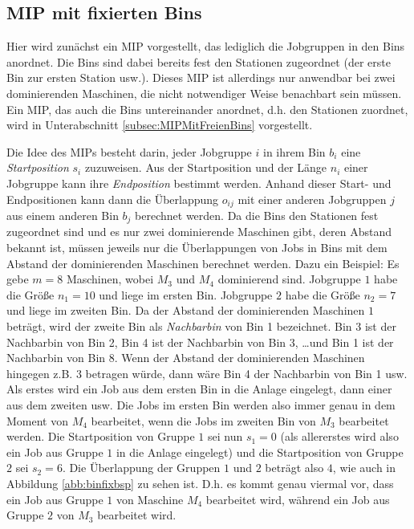 \documentclass{scrreprt}
\begin{document}
\subsection{MIP mit fixierten Bins}
\label{subsec:MIPMitFixiertenBins}
Hier wird zunächst ein MIP vorgestellt, das lediglich die Jobgruppen in den Bins anordnet.
Die Bins sind dabei bereits fest den Stationen zugeordnet (der erste Bin zur ersten Station usw.).
Dieses MIP ist allerdings nur anwendbar bei zwei dominierenden Maschinen, die nicht notwendiger Weise benachbart sein müssen.
Ein MIP, das auch die Bins untereinander anordnet, d.h. den Stationen zuordnet, wird in Unterabschnitt \ref{subsec:MIPMitFreienBins} vorgestellt.

Die Idee des MIPs besteht darin, jeder Jobgruppe $i$ in ihrem Bin $b_i$ eine \textit{Startposition} $s_i$ zuzuweisen.
Aus der Startposition und der Länge $n_i$ einer Jobgruppe kann ihre \textit{Endposition} bestimmt werden.
Anhand dieser Start- und Endpositionen kann dann die Überlappung $o_{ij}$ mit einer anderen Jobgruppen $j$ aus einem anderen Bin $b_j$
berechnet werden.
Da die Bins den Stationen fest zugeordnet sind und es nur zwei dominierende Maschinen gibt, deren Abstand bekannt ist, 
müssen jeweils nur die Überlappungen von Jobs in Bins mit dem Abstand der dominierenden Maschinen berechnet werden.
Dazu ein Beispiel: Es gebe $m=8$ Maschinen, wobei $M_3$ und $M_4$ dominierend sind. 
Jobgruppe $1$ habe die Größe $n_1=10$ und liege im ersten Bin.
Jobgruppe $2$ habe die Größe $n_2=7$ und liege im zweiten Bin.
Da der Abstand der dominierenden Maschinen $1$ beträgt, wird der zweite Bin als \textit{Nachbarbin} von Bin 1 bezeichnet.
Bin 3 ist der Nachbarbin von Bin 2, Bin 4 ist der Nachbarbin von Bin 3, \ldots und Bin 1 ist der Nachbarbin von Bin 8.
Wenn der Abstand der dominierenden Maschinen hingegen z.B. $3$ betragen würde, dann wäre Bin 4 der Nachbarbin von Bin 1 usw.
Als erstes wird ein Job aus dem ersten Bin in die Anlage eingelegt, dann einer aus dem zweiten usw. 
Die Jobs im ersten Bin werden also immer genau in dem Moment von $M_4$ bearbeitet, wenn die Jobs im zweiten Bin von $M_3$ bearbeitet werden.
Die Startposition von Gruppe $1$ sei nun $s_1=0$ (als allererstes wird also ein Job aus Gruppe $1$ in die Anlage eingelegt)
und die Startposition von Gruppe $2$ sei $s_2=6$.
Die Überlappung der Gruppen $1$ und $2$ beträgt also $4$, wie auch in Abbildung \ref{abb:binfixbsp} zu sehen ist.
D.h. es kommt genau viermal vor, dass ein Job aus Gruppe $1$ von Maschine $M_4$ bearbeitet wird, während ein Job aus Gruppe $2$ von $M_3$ bearbeitet wird.
\end{document}
